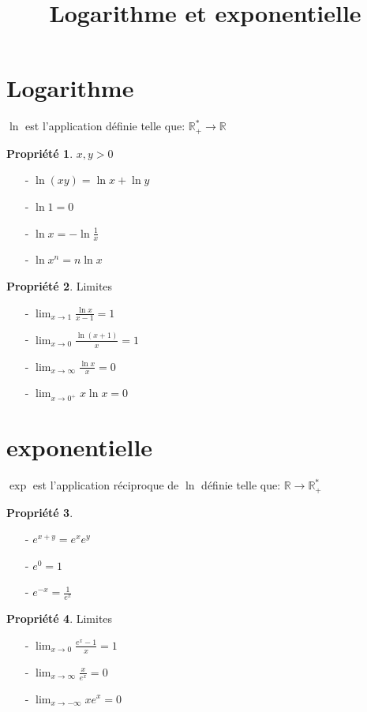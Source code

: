 \documentclass[fleqn]{article}
\title{Logarithme et exponentielle}
\date{}
\theoremstyle{definition} \newtheorem*{defi}{D\'efinition}
\theoremstyle{definition} \newtheorem*{theo}{Th\'eor\`eme}
\theoremstyle{definition} \newtheorem*{prop}{Propri\'et\'e}
\begin{document}
\maketitle

\section{Logarithme}
$\ln$ est l'application d\'efinie telle que: $\mathbb{R}^*_+ \rightarrow \mathbb{R}$
\begin{prop} $x,y > 0$
	\begin{itemize}
		\item [-] $\ln (xy) = \ln x + \ln y$
		\item [-] $\ln 1 = 0$
		\item [-] $\ln x = -\ln \frac{1}{x}$
		\item [-] $\ln x^n = n\ln x$
	\end{itemize}
\end{prop}
\begin{prop} Limites
	\begin{itemize}
		\item [-] $\lim_{x\to 1} \frac{\ln x}{x-1} = 1$
		\item [-] $\lim_{x\to 0} \frac{\ln (x+1)}{x} = 1$
		\item [-] $\lim_{x\to\infty} \frac{\ln x}{x} = 0$
		\item [-] $\lim_{x\to 0^+} x\ln x = 0$
	\end{itemize}
\end{prop}

\section{exponentielle}
$\exp$ est l'application r\'eciproque de $\ln$ d\'efinie telle que: $\mathbb{R} \rightarrow \mathbb{R}^*_+$
\begin{prop} $ $
	\begin{itemize}
		\item [-] $e^{x+y} = e^xe^y$
		\item [-] $e^0 = 1$
		\item [-] $e^{-x} = \frac{1}{e^x}$
	\end{itemize}
\end{prop}
\begin{prop} Limites
	\begin{itemize}
		\item [-] $\lim_{x\to 0} \frac{e^x-1}{x} = 1$
		\item [-] $\lim_{x\to\infty} \frac{x}{e^x} = 0$
		\item [-] $\lim_{x\to-\infty} xe^x = 0$
	\end{itemize}
\end{prop}
\end{document}
